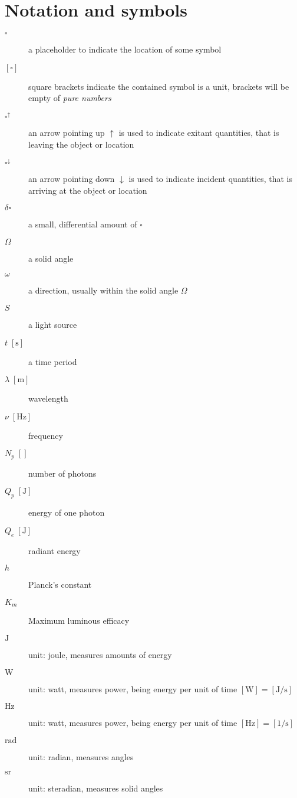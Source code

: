 
\chapter{Notation and symbols}\label{ch:notation}

\begin{description}
\item[ {$\square$} ] a placeholder to indicate the location of some symbol
\item[ {$[\square]$} ] square brackets indicate the contained symbol is a unit,
	brackets will be empty of \emph{pure numbers}
\item[ {$\square^\uparrow$} ] an arrow pointing up $\uparrow$ is used to indicate 
	exitant quantities, that is leaving the object or location
\item[ {$\square^\downarrow$} ] an arrow pointing down $\downarrow$ is used to indicate 
	incident quantities, that is arriving at the object or location

\item[ {$\delta\square$} ] a small, differential amount of $\square$

\item[{$\Omega$}] a solid angle
\item[{$\omega$}] a direction, usually within the solid angle $\Omega$
\item[$S$] a light source
\item[ {$t\;[\unit\second]$} ] a time period

\item[ {$\lambda\;[\unit\meter]$} ] wavelength
\item[ {$\nu\;[\unit\hertz]$} ] frequency

\item[ {$N_p\;[]$} ] number of photons
\item[ {$Q_p\;[\unit\joule]$} ] energy of one photon
\item[ {$Q_e\;[\unit\joule]$} ] radiant energy

\item[ {$h$} ] Planck's constant
\item[ {$K_m$} ] Maximum luminous efficacy

\item[ {$\unit\joule$} ] unit: joule, measures amounts of energy
\item[ {$\unit\watt$} ] unit: watt, measures power, being energy per 
	unit of time $[\unit\watt] = [\unit{\joule\per\second}]$
\item[ {$\unit\hertz$} ] unit: watt, measures power, being energy per 
	unit of time $[\unit\hertz] = [\unit{1\per\second}]$
\item[ {$\unit\radian$} ] 	unit: radian, measures angles
\item[ {$\unit\steradian$} ] unit: steradian, measures solid angles
                   
\end{description}

